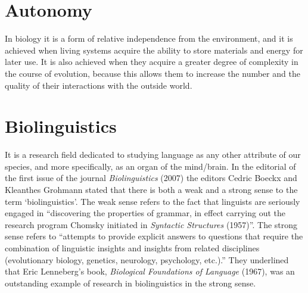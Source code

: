 \documentclass[12pt]{article}
\begin{document}
\section{Autonomy}
In biology it is a form of relative independence from the environment, and it is achieved when living systems acquire the ability to store materials and energy for later use. It is also achieved when they acquire a greater degree of complexity in the course of evolution, because this allows them to increase the number and the quality of their interactions with the outside world. 


\hypertarget{biolinguistics}{}
\section{Biolinguistics}
It is a research field dedicated to studying language as any other attribute of our species, and more specifically, as an organ of the mind/brain. In the editorial of the first issue of the journal \textit{Biolinguistics} (2007) the editors Cedric Boeckx and Kleanthes Grohmann stated that there is both a weak and a strong sense to the term `biolinguistics'. The weak sense refers to the fact that linguists are seriously engaged in ``discovering the properties of grammar, in effect carrying out the research program Chomsky initiated in \textit{Syntactic Structures} (1957)''. The strong sense refers to ``attempts to provide explicit answers to questions that require the combination of linguistic insights and insights from related disciplines (evolutionary biology, genetics, neurology, psychology, etc.).'' They underlined that Eric Lenneberg's book, \textit{Biological Foundations of Language} (1967), was an outstanding example of research in biolinguistics in the strong sense.
\end{document}

